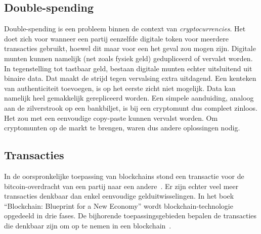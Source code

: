 \subsection{Double-spending}
\label{sub:double-spending}

Double-spending is een probleem binnen de context van \textit{cryptocurrencies}. Het doet zich voor wanneer een partij eenzelfde digitale token voor meerdere transacties gebruikt, hoewel dit maar voor een het geval zou mogen zijn. Digitale munten kunnen namelijk (net zoals fysiek geld) gedupliceerd of vervalst worden. In tegenstelling tot tastbaar geld, bestaan digitale munten echter uitsluitend uit binaire data. Dat maakt de strijd tegen vervalsing extra uitdagend. Een kenteken van authenticiteit toevoegen, is op het eerste zicht niet mogelijk. Data kan namelijk heel gemakkelijk gerepliceerd worden. Een simpele aanduiding, analoog aan de zilverstrook op een bankbiljet, is bij een cryptomunt dus compleet zinloos. Het zou met een eenvoudige copy-paste kunnen vervalst worden. Om cryptomunten op de markt te brengen, waren dus andere oplossingen nodig.


\subsection{Transacties}
\label{sub:transacties}

In de oorspronkelijke toepassing van blockchains stond een transactie voor de bitcoin-overdracht van een partij naar een andere~\autocite{Pierro2017}. Er zijn echter veel meer transacties denkbaar dan enkel eenvoudige gelduitwisselingen.
In het boek ``Blockchain: Blueprint for a New Economy'' wordt blockchain-technologie opgedeeld in drie fases. De bijhorende toepassingsgebieden bepalen de transacties die denkbaar zijn om op te nemen in een blockchain~\autocite{Swan2015}.

